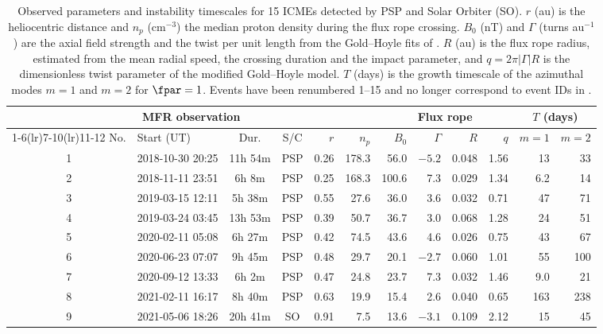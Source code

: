 \begin{table}[ht]
  \footnotesize
  \caption{%
    Observed parameters and instability timescales for 15 ICMEs detected by PSP and Solar Orbiter (SO).
    $r$ (au) is the heliocentric distance and $n_p$ (cm$^{-3}$) the median proton density during the flux rope crossing.
    $B_0$ (nT) and $\Gamma$ (turns au$^{-1}$) are the axial field strength and the twist per unit length from the Gold--Hoyle fits of \cite{goodTurbulence2023}.
    $R$ (au) is the flux rope radius, estimated from the mean radial speed, the crossing duration and the impact parameter, and $q = 2\pi|\Gamma| R$ is the dimensionless twist parameter of the modified Gold--Hoyle model.
    $T$ (days) is the growth timescale of the azimuthal modes $m = 1$ and $m = 2$ for $\fpar = 1$.
    Events have been renumbered 1--15 and no longer correspond to event IDs in \cite{goodTurbulence2023}.%
  }
  \label{tab:icme}
  \setlength{\tabcolsep}{2.5pt}
  \centering
  \begin{tabular}{c l c c r r r r r r r r}
    \toprule
    \multicolumn{6}{c}{MFR observation} &
    \multicolumn{4}{c}{Flux rope} &
    \multicolumn{2}{c}{$T$ (days)} \\
    \cmidrule(lr){1-6}\cmidrule(lr){7-10}\cmidrule(lr){11-12}
    {No.} & {Start (UT)} & {Dur.} & {S/C} & {$r$} & {$n_p$} &
    {$B_{0}$} & {$\Gamma$} & {$R$} & {$q$} &
    {$m=1$} & {$m=2$} \\
    \midrule
    1 & 2018-10-30 20:25 & 11h 54m & PSP & 0.26 & 178.3 & 56.0 & $-5.2$ & 0.048 & 1.56 & 13 & 33 \\
    2 & 2018-11-11 23:51 & 6h 8m & PSP & 0.25 & 168.3 & 100.6 & 7.3 & 0.029 & 1.34 & 6.2 & 14 \\
    3 & 2019-03-15 12:11 & 5h 38m & PSP & 0.55 & 27.6 & 36.0 & 3.6 & 0.032 & 0.71 & 47 & 71 \\
    4 & 2019-03-24 03:45 & 13h 53m & PSP & 0.39 & 50.7 & 36.7 & 3.0 & 0.068 & 1.28 & 24 & 51 \\
    5 & 2020-02-11 05:08 & 6h 27m & PSP & 0.42 & 74.5 & 43.6 & 4.6 & 0.026 & 0.75 & 43 & 67 \\
    6 & 2020-06-23 07:07 & 9h 45m & PSP & 0.48 & 29.7 & 20.1 & $-2.7$ & 0.060 & 1.01 & 55 & 100 \\
    7 & 2020-09-12 13:33 & 6h 2m & PSP & 0.47 & 24.8 & 23.7 & 7.3 & 0.032 & 1.46 & 9.0 & 21 \\
    8 & 2021-02-11 16:17 & 8h 40m & PSP & 0.63 & 19.9 & 15.4 & 2.6 & 0.040 & 0.65 & 163 & 238 \\
    9 & 2021-05-06 18:26 & 20h 41m & SO & 0.91 & 7.5 & 13.6 & $-3.1$ & 0.109 & 2.12 & 15 & 45 \\

\end{tabular}
\end{table}
